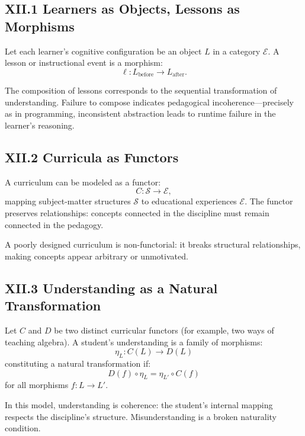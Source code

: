 \documentclass[11pt,letterpaper]{article}
\begin{document}
\subsection{XII.1 Learners as Objects, Lessons as Morphisms}

Let each learner’s cognitive configuration be an object \(L\) in a category \(\mathcal{E}\). A lesson or instructional event is a morphism:
\[
\ell : L_{\text{before}} \to L_{\text{after}}.
\]

The composition of lessons corresponds to the sequential transformation of understanding. Failure to compose indicates pedagogical incoherence—precisely as in programming, inconsistent abstraction leads to runtime failure in the learner’s reasoning.

\subsection{XII.2 Curricula as Functors}

A curriculum can be modeled as a functor:
\[
C: \mathcal{S} \to \mathcal{E},
\]
mapping subject-matter structures \(\mathcal{S}\) to educational experiences \(\mathcal{E}\). The functor preserves relationships: concepts connected in the discipline must remain connected in the pedagogy.

A poorly designed curriculum is non-functorial: it breaks structural relationships, making concepts appear arbitrary or unmotivated.

\subsection{XII.3 Understanding as a Natural Transformation}

Let \(C\) and \(D\) be two distinct curricular functors (for example, two ways of teaching algebra). A student’s understanding is a family of morphisms:
\[
\eta_L : C(L) \to D(L)
\]
constituting a natural transformation if:
\[
D(f) \circ \eta_L = \eta_{L'} \circ C(f)
\]
for all morphisms \(f: L \to L'\).

In this model, understanding is coherence: the student’s internal mapping respects the discipline’s structure. Misunderstanding is a broken naturality condition.
\end{document}
